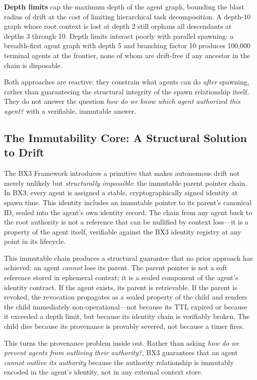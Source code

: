 \textbf{Depth limits} cap the maximum depth of the agent graph, bounding the blast radius of drift at the cost of limiting hierarchical task decomposition. A depth-10 graph whose root context is lost at depth 2 still orphans all descendants at depths 3 through 10. Depth limits interact poorly with parallel spawning: a breadth-first agent graph with depth 5 and branching factor 10 produces 100,000 terminal agents at the frontier, none of whom are drift-free if any ancestor in the chain is disposable.

Both approaches are reactive: they constrain what agents can do \emph{after} spawning, rather than guaranteeing the structural integrity of the spawn relationship itself. They do not answer the question \emph{how do we know which agent authorized this agent?} with a verifiable, immutable answer.

\subsection{The Immutability Core: A Structural Solution to Drift}

The BX3 Framework introduces a primitive that makes autonomous drift not merely unlikely but \emph{structurally impossible}: the immutable parent pointer chain. In BX3, every agent is assigned a stable, cryptographically signed identity at spawn time. This identity includes an immutable pointer to its parent's canonical ID, sealed into the agent's own identity record. The chain from any agent back to the root authority is not a reference that can be nullified by context loss---it is a property of the agent itself, verifiable against the BX3 identity registry at any point in its lifecycle.

This immutable chain produces a structural guarantee that no prior approach has achieved: an agent \emph{cannot} lose its parent. The parent pointer is not a soft reference stored in ephemeral context; it is a sealed component of the agent's identity contract. If the agent exists, its parent is retrievable. If the parent is revoked, the revocation propagates as a sealed property of the child and renders the child immediately non-operational---not because its TTL expired or because it exceeded a depth limit, but because its identity chain is verifiably broken. The child dies because its provenance is provably severed, not because a timer fires.

This turns the provenance problem inside out. Rather than asking \emph{how do we prevent agents from outliving their authority?}, BX3 guarantees that an agent \emph{cannot outlive its authority} because the authority relationship is immutably encoded in the agent's identity, not in any external context store.

